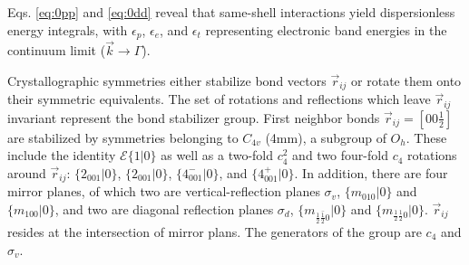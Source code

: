 \documentclass[twocolumn,showpacs,preprintnumbers,superscriptaddress,prb,floatfix,aps,10pt]{revtex4-1}
\newcommand*{\id}{\mathcal{E}}
\newcommand*{\bondvec}{\vec{r}_{ij}}
\newcommand{\seitz}[2]{\{#1|#2\}}
\begin{document}
Eqs. \ref{eq:0pp} and \ref{eq:0dd} reveal that same-shell interactions yield dispersionless energy integrals, with $\epsilon_p$, $\epsilon_e$, and $\epsilon_t$ representing electronic band energies in the continuum limit ($\vec{k} \rightarrow \Gamma$).


Crystallographic symmetries either stabilize bond vectors $\bondvec$ or rotate them onto their symmetric equivalents. The set of rotations and reflections which leave $\bondvec$ invariant represent the bond stabilizer group. First neighbor bonds $\bondvec = [00\frac{1}{2}]$ are stabilized by symmetries belonging to $C_{4v}$ (4mm), a subgroup of $O_h$. These include the identity $\id \seitz{1}{0}$ as well as a two-fold $c_{4}^2$ and two four-fold $c_{4}$ rotations around $\bondvec$: $\seitz{2_{001}}{0}$, $\seitz{2_{001}}{0}$, $\seitz{4^-_{001}}{0}$, and $\seitz{4^+_{001}}{0}$. In addition, there are four mirror planes, of which two are vertical-reflection planes $\sigma_v$, $\seitz{m_{010}}{0}$ and $\seitz{m_{100}}{0}$, and two are diagonal reflection planes $\sigma_d$, $\seitz{m_{\frac{1}{2}\bar{\frac{1}{2}}0}}{0}$ and $\seitz{m_{\frac{1}{2}\frac{1}{2}0}}{0}$. $\bondvec$ resides at the intersection of mirror plans. The generators of the group are $c_4$ and $\sigma_v$. 
\end{document}
